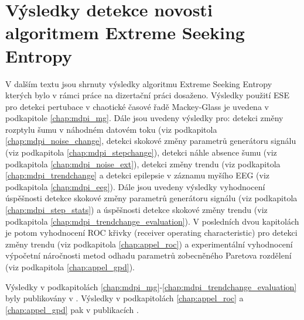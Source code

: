 \chapter{Výsledky detekce novosti algoritmem Extreme Seeking Entropy}\label{chap:vysledky}
V dalším textu jsou shrnuty výsledky algoritmu Extreme Seeking Entropy kterých bylo v rámci práce na dizertační práci dosaženo. Výsledky použití ESE pro detekci pertubace v chaotické časové řadě Mackey-Glass je uvedena v podkapitole \ref{chap:mdpi_mg}. Dále jsou uvedeny výsledky pro: detekci změny rozptylu šumu v náhodném datovém toku (viz podkapitola \ref{chap:mdpi_noise_change}, detekci skokové změny parametrů generátoru signálu (viz podkapitola \ref{chap:mdpi_stepchange}), detekci náhle absence šumu (viz podkapitola \ref{chap:mdpi_noise_ext}), detekci změny trendu (viz podkapitola \ref{chap:mdpi_trendchange} a detekci epilepsie v záznamu myšího EEG (viz podkapitola \ref{chap:mdpi_eeg}). Dále jsou uvedeny výsledky vyhodnocení úspěšnosti detekce skokové změny parametrů generátoru signálu (viz podkapitola \ref{chap:mdpi_step_stats}) a úspěšnosti detekce skokové změny trendu (viz podkapitola \ref{chap:mdpi_trendchange_evaluation}). V posledních dvou kapitolách je potom vyhodnocení ROC křivky (receiver operating characteristic) pro detekci změny trendu (viz podkapitola \ref{chap:appel_roc}) a experimentální vyhodnocení výpočetní náročnosti metod odhadu parametrů zobecněného Paretova rozdělení (viz podkapitola \ref{chap:appel_gpd}).
\par Výsledky v podkapitolách \ref{chap:mdpi_mg}-\ref{chap:mdpi_trendchange_evaluation} byly publikovány v \cite{ese_mdpi}. Výsledky v podkapitolách \ref{chap:appel_roc} a \ref{chap:appel_gpd} pak v publikacích \cite{appel2,appel3}.

